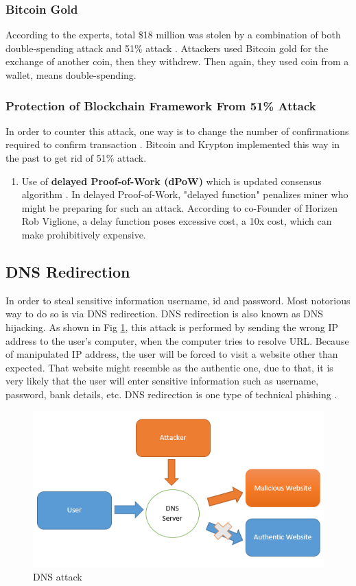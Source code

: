\documentclass[a4paper,twoside,12pt]{report}
\begin{document}
\begin{spacing}{1.5}
\subsubsection{Bitcoin Gold}
According to the experts, total \$18 million was stolen by a combination of both double-spending attack and 51\% attack \cite{51attackonbitcoingold}. Attackers used Bitcoin gold for the exchange of another coin, then they withdrew. Then again, they used coin from a wallet, means double-spending. 
\subsubsection{Protection of Blockchain Framework From 51\% Attack}
In order to counter this attack, one way is to change the number of confirmations required to confirm transaction \cite{what_is_51attack_2018}. Bitcoin and Krypton implemented this way in the past to get rid of 51\% attack.
\begin{enumerate}
	\item{Use of \textbf{delayed Proof-of-Work (dPoW)} which is updated consensus algorithm \cite{51_solution_2018}. In delayed Proof-of-Work, "delayed function" penalizes miner who might be preparing for such an attack. According to co-Founder of Horizen Rob Viglione, a delay function poses excessive cost, a 10x cost, which can make prohibitively expensive.}
\end{enumerate}
\subsection{DNS Redirection}
\label{dnsattack}
In order to steal sensitive information username, id and password. Most notorious way to do so is via DNS redirection. DNS redirection is also known as DNS hijacking. As shown in Fig \ref{img: dns}, this attack is performed by sending the wrong IP address to the user's computer, when the computer tries to resolve URL. Because of manipulated IP address, the user will be forced to visit a website other than expected. That website might resemble as the authentic one, due to that, it is very likely that the user will enter sensitive information such as username, password, bank details, etc. DNS redirection is one type of technical phishing \cite{andryukhinphishing}.
\begin{figure}[h!]
\begin{center}
  \includegraphics[width=0.8\linewidth]{images/dns.png}
  \caption{\fontsize{10}{10}\selectfont DNS attack}
  \label{img: dns}
\end{center}
\end{figure}

\end{spacing}
\end{document}
